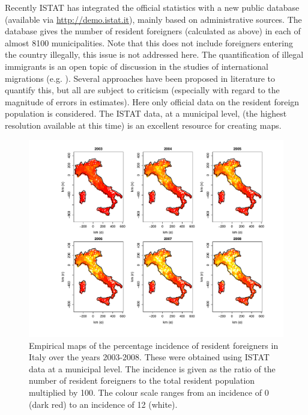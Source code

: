 Recently ISTAT has integrated the official statistics with a new public database (available via \url{http://demo.istat.it}), mainly based on administrative sources. The database gives the number of resident foreigners (calculated as above) in each of almost 8100 municipalities. Note that this does not include foreigners entering the country illegally, this issue is not addressed here. The quantification of illegal immigrants is an open topic of discussion in the studies of international migrations (e.g. \cite{Strozza2004}). Several approaches have been proposed in literature to quantify this, but all are subject to criticism (especially with regard to the magnitude of errors in estimates). Here only official data on the resident foreign population is considered. The ISTAT data, at a municipal level, (the highest resolution available at this time) is an excellent resource for creating maps.

\begin{figure}[tbp]
	\centering
		\includegraphics[width=\textwidth]{it/Raw}
	\caption{Empirical maps of the percentage incidence of resident foreigners in Italy over the years 2003-2008. These were obtained using ISTAT data at a municipal level.	The incidence is given as the ratio of the number of resident foreigners to the total resident population multiplied by 100. The colour scale ranges from an incidence of 0 (dark red) to an incidence of 12 (white).}
	\label{Rd}
\end{figure}


